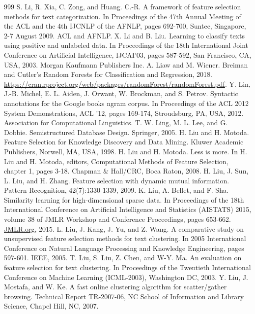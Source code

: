 \documentclass[11pt,openany,executivepaper]{book}
\begin{document}
\begin{thebibliography}{999}
 S. Li, R. Xia, C. Zong, and Huang. C.-R. A framework of feature selection methods for text categorization. In Proceedings of the 47th Annual Meeting of the ACL and the 4th IJCNLP of the AFNLP, pages 692-700, Suntec, Singapore, 2-7 August 2009. ACL and AFNLP.
 X. Li and B. Liu. Learning to classify texts using positive and unlabeled data. In Proceedings of the 18th International Joint Conference on Artificial Intelligence, IJCAI'03, pages 587-592, San Francisco, CA, USA, 2003. Morgan Kaufmann Publishers Inc.
 A. Liaw and M. Wiener. Breiman and Cutler's Random Forests for Classification and Regression, 2018. \url{https://cran.rproject.org/web/packages/randomForest/randomForest.pdf}.
 Y. Lin, J.-B. Michel, E. L. Aiden, J. Orwant, W. Brockman, and S. Petrov. Syntactic annotations for the Google books ngram corpus. In Proceedings of the ACL 2012 System Demonstrations, ACL '12, pages 169-174, Stroudsburg, PA, USA, 2012. Association for Computational Linguistics.
 T. W. Ling, M. L. Lee, and G. Dobbie. Semistructured Database Design. Springer, 2005.
 H. Liu and H. Motoda. Feature Selection for Knowledge Discovery and Data Mining. Kluwer Academic Publishers, Norwell, MA, USA, 1998.
 H. Liu and H. Motoda. Less is more. In H. Liu and H. Motoda, editors, Computational Methods of Feature Selection, chapter 1, pages 3-18. Chapman \& Hall/CRC, Boca Raton, 2008.
 H. Liu, J. Sun, L. Liu, and H. Zhang. Feature selection with dynamic mutual information. Pattern Recognition, 42(7):1330-1339, 2009.
 K. Liu, A. Bellet, and F. Sha. Similarity learning for high-dimensional sparse data. In Proceedings of the 18th International Conference on Artificial Intelligence and Statistics (AISTATS) 2015, volume 38 of JMLR Workshop and Conference Proceedings, pages 653-662. \href{http://JMLR.org}{JMLR.org}, 2015.
 L. Liu, J. Kang, J. Yu, and Z. Wang. A comparative study on unsupervised feature selection methods for text clustering. In 2005 International Conference on Natural Language Processing and Knowledge Engineering, pages 597-601. IEEE, 2005.
 T. Liu, S. Liu, Z. Chen, and W-Y. Ma. An evaluation on feature selection for text clustering. In Proceedings of the Twentieth International Conference on Machine Learning (ICML-2003), Washington DC, 2003.
 Y. Liu, J. Mostafa, and W. Ke. A fast online clustering algorithm for scatter/gather browsing. Technical Report TR-2007-06, NC School of Information and Library Science, Chapel Hill, NC, 2007.

\end{thebibliography}
\end{document}

